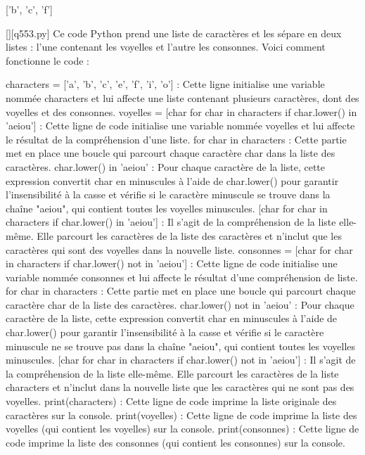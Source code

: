 ['b', 'c', 'f']
        \par
        \begin{solution}
            \renewcommand{\nomfichier}{q553.py}
            \pythonfile{\chemincode \nomfichier}[][\nomfichier]
            Ce code Python prend une liste de caractères et les sépare en deux listes : l'une contenant les voyelles et l'autre les consonnes. Voici comment fonctionne le code :

    characters = ['a', 'b', 'c', 'e', 'f', 'i', 'o'] : Cette ligne initialise une variable nommée characters et lui affecte une liste contenant plusieurs caractères, dont des voyelles et des consonnes.
    voyelles = [char for char in characters if char.lower() in 'aeiou'] : Cette ligne de code initialise une variable nommée voyelles et lui affecte le résultat de la compréhension d'une liste.
        for char in characters : Cette partie met en place une boucle qui parcourt chaque caractère char dans la liste des caractères.
        char.lower() in 'aeiou' : Pour chaque caractère de la liste, cette expression convertit char en minuscules à l'aide de char.lower() pour garantir l'insensibilité à la casse et vérifie si le caractère minuscule se trouve dans la chaîne "aeiou", qui contient toutes les voyelles minuscules.
        [char for char in characters if char.lower() in 'aeiou'] : Il s'agit de la compréhension de la liste elle-même. Elle parcourt les caractères de la liste des caractères et n'inclut que les caractères qui sont des voyelles dans la nouvelle liste.
    consonnes = [char for char in characters if char.lower() not in 'aeiou'] : Cette ligne de code initialise une variable nommée consonnes et lui affecte le résultat d'une compréhension de liste.
        for char in characters : Cette partie met en place une boucle qui parcourt chaque caractère char de la liste des caractères.
        char.lower() not in 'aeiou' : Pour chaque caractère de la liste, cette expression convertit char en minuscules à l'aide de char.lower() pour garantir l'insensibilité à la casse et vérifie si le caractère minuscule ne se trouve pas dans la chaîne "aeiou", qui contient toutes les voyelles minuscules.
        [char for char in characters if char.lower() not in 'aeiou'] : Il s'agit de la compréhension de la liste elle-même. Elle parcourt les caractères de la liste characters et n'inclut dans la nouvelle liste que les caractères qui ne sont pas des voyelles.
    print(characters) : Cette ligne de code imprime la liste originale des caractères sur la console.
    print(voyelles) : Cette ligne de code imprime la liste des voyelles (qui contient les voyelles) sur la console.
    print(consonnes) : Cette ligne de code imprime la liste des consonnes (qui contient les consonnes) sur la console.
        \end{solution}
        


